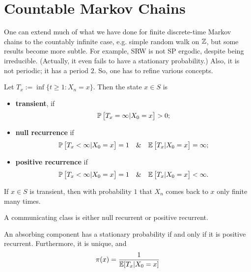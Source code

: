 \section{Countable Markov Chains}

One can extend much of what we have done for finite discrete-time Markov chains to the countably infinite case, e.g. simple random walk on $\mathbb{Z}$, but some results become more subtle. For example, SRW is not SP ergodic, despite being irreducible. (Actually, it even fails to have a stationary probability.) Also, it is not periodic; it has a period $2$. So, one has to refine various concepts. 

\begin{definition}
    Let $T_x := \inf \{ t \ge 1 : X_n = x \}$. Then the state $x \in S$ is 
    \begin{itemize}
        \item \textbf{transient}, if 
        \begin{equation*}
            \mathbb{P} \left[ T_x = \infty | X_0 = x \right] > 0;
        \end{equation*}
        \item \textbf{null recurrence} if 
        \begin{equation*}
            \mathbb{P} \left[ T_x < \infty | X_0 = x \right] = 1 \quad \& \quad \mathbb{E} \left[ T_x | X_0 = x \right] = \infty;
        \end{equation*}
        \item \textbf{positive recurrence} if 
        \begin{equation*}
            \mathbb{P} \left[ T_x < \infty | X_0 = x \right] = 1 \quad \& \quad \mathbb{E} \left[ T_x | X_0 = x \right] < \infty.
        \end{equation*}
    \end{itemize}
\end{definition}

\begin{remark}
    If $x\in S$ is transient, then with probability $1$ that $X_n$ comes back to $x$ only finite many times.
\end{remark}

\begin{proposition}
    A communicating class is either null recurrent or positive recurrent.
\end{proposition}

\begin{theorem}
    An absorbing component has a stationary probability if and only if it is positive recurrent. Furthermore, it is unique, and 
    \begin{equation*}
        \pi(x) = \frac{1}{\mathbb{E} [T_x | X_0 = x]}
    \end{equation*}
\end{theorem}
